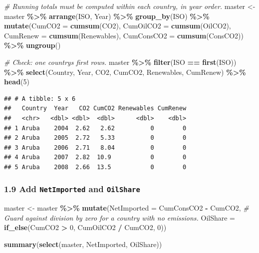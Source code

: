 \documentclass[
]{article}
\newenvironment{Shaded}{\begin{snugshade}}{\end{snugshade}}
\newcommand{\AttributeTok}[1]{\textcolor[rgb]{0.13,0.29,0.53}{#1}}
\newcommand{\CommentTok}[1]{\textcolor[rgb]{0.56,0.35,0.01}{\textit{#1}}}
\newcommand{\DecValTok}[1]{\textcolor[rgb]{0.00,0.00,0.81}{#1}}
\newcommand{\FunctionTok}[1]{\textcolor[rgb]{0.13,0.29,0.53}{\textbf{#1}}}
\newcommand{\NormalTok}[1]{#1}
\newcommand{\OtherTok}[1]{\textcolor[rgb]{0.56,0.35,0.01}{#1}}
\newcommand{\SpecialCharTok}[1]{\textcolor[rgb]{0.81,0.36,0.00}{\textbf{#1}}}
\begin{document}
\begin{Shaded}
\begin{Highlighting}[]
\CommentTok{\# Running totals must be computed within each country, in year order.}
\NormalTok{master }\OtherTok{\textless{}{-}}\NormalTok{ master }\SpecialCharTok{\%\textgreater{}\%}
  \FunctionTok{arrange}\NormalTok{(ISO, Year) }\SpecialCharTok{\%\textgreater{}\%}
  \FunctionTok{group\_by}\NormalTok{(ISO) }\SpecialCharTok{\%\textgreater{}\%}
  \FunctionTok{mutate}\NormalTok{(}\AttributeTok{CumCO2 =} \FunctionTok{cumsum}\NormalTok{(CO2),}
         \AttributeTok{CumOilCO2 =} \FunctionTok{cumsum}\NormalTok{(OilCO2),}
         \AttributeTok{CumRenew =} \FunctionTok{cumsum}\NormalTok{(Renewables),}
         \AttributeTok{CumConsCO2 =} \FunctionTok{cumsum}\NormalTok{(ConsCO2)) }\SpecialCharTok{\%\textgreater{}\%}
  \FunctionTok{ungroup}\NormalTok{()}

\CommentTok{\# Check: one country\textquotesingle{}s first rows.}
\NormalTok{master }\SpecialCharTok{\%\textgreater{}\%}
  \FunctionTok{filter}\NormalTok{(ISO }\SpecialCharTok{==} \FunctionTok{first}\NormalTok{(ISO)) }\SpecialCharTok{\%\textgreater{}\%}
  \FunctionTok{select}\NormalTok{(Country, Year, CO2, CumCO2, Renewables, CumRenew) }\SpecialCharTok{\%\textgreater{}\%}
  \FunctionTok{head}\NormalTok{(}\DecValTok{5}\NormalTok{)}
\end{Highlighting}
\end{Shaded}

\begin{verbatim}
## # A tibble: 5 x 6
##   Country  Year   CO2 CumCO2 Renewables CumRenew
##   <chr>   <dbl> <dbl>  <dbl>      <dbl>    <dbl>
## 1 Aruba    2004  2.62   2.62          0        0
## 2 Aruba    2005  2.72   5.33          0        0
## 3 Aruba    2006  2.71   8.04          0        0
## 4 Aruba    2007  2.82  10.9           0        0
## 5 Aruba    2008  2.66  13.5           0        0
\end{verbatim}

\subsubsection{\texorpdfstring{1.9 Add \texttt{NetImported} and
\texttt{OilShare}}{1.9 Add NetImported and OilShare}}\label{add-netimported-and-oilshare}

\begin{Shaded}
\begin{Highlighting}[]
\NormalTok{master }\OtherTok{\textless{}{-}}\NormalTok{ master }\SpecialCharTok{\%\textgreater{}\%}
  \FunctionTok{mutate}\NormalTok{(}\AttributeTok{NetImported =}\NormalTok{ CumConsCO2 }\SpecialCharTok{{-}}\NormalTok{ CumCO2,}
         \CommentTok{\# Guard against division by zero for a country with no emissions.}
         \AttributeTok{OilShare =} \FunctionTok{if\_else}\NormalTok{(CumCO2 }\SpecialCharTok{\textgreater{}} \DecValTok{0}\NormalTok{, CumOilCO2 }\SpecialCharTok{/}\NormalTok{ CumCO2, }\DecValTok{0}\NormalTok{))}

\FunctionTok{summary}\NormalTok{(}\FunctionTok{select}\NormalTok{(master, NetImported, OilShare))}
\end{Highlighting}
\end{Shaded}
\end{document}
